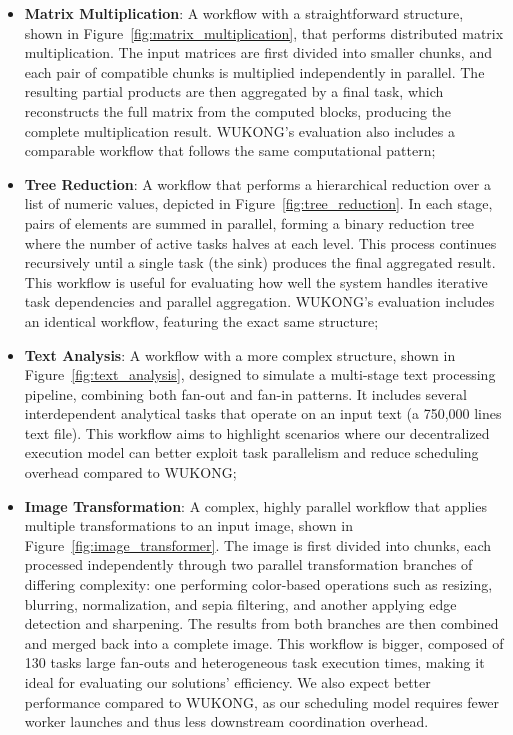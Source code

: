 \documentclass[conference]{IEEEtran}
\begin{document}
\begin{itemize}
    \item \textbf{Matrix Multiplication}: A workflow with a straightforward structure, shown in Figure~\ref{fig:matrix_multiplication}, that performs distributed matrix multiplication. The input matrices are first divided into smaller chunks, and each pair of compatible chunks is multiplied independently in parallel. The resulting partial products are then aggregated by a final task, which reconstructs the full matrix from the computed blocks, producing the complete multiplication result. WUKONG's evaluation also includes a comparable workflow that follows the same computational pattern;

    \item \textbf{Tree Reduction}: A workflow that performs a hierarchical reduction over a list of numeric values, depicted in Figure~\ref{fig:tree_reduction}. In each stage, pairs of elements are summed in parallel, forming a binary reduction tree where the number of active tasks halves at each level. This process continues recursively until a single task (the sink) produces the final aggregated result. This workflow is useful for evaluating how well the system handles iterative task dependencies and parallel aggregation. WUKONG's evaluation includes an identical workflow, featuring the exact same structure;

    \item \textbf{Text Analysis}: A workflow with a more complex structure, shown in Figure~\ref{fig:text_analysis}, designed to simulate a multi-stage text processing pipeline, combining both fan-out and fan-in patterns. It includes several interdependent analytical tasks that operate on an input text (a 750,000 lines text file). This workflow aims to highlight scenarios where our decentralized execution model can better exploit task parallelism and reduce scheduling overhead compared to WUKONG;

    \item \textbf{Image Transformation}: A complex, highly parallel workflow that applies multiple transformations to an input image, shown in Figure~\ref{fig:image_transformer}. The image is first divided into chunks, each processed independently through two parallel transformation branches of differing complexity: one performing color-based operations such as resizing, blurring, normalization, and sepia filtering, and another applying edge detection and sharpening. The results from both branches are then combined and merged back into a complete image. This workflow is bigger, composed of 130 tasks large fan-outs and heterogeneous task execution times, making it ideal for evaluating our solutions' efficiency. We also expect better performance compared to WUKONG, as our scheduling model requires fewer worker launches and thus less downstream coordination overhead.
\end{itemize}
\end{document}
